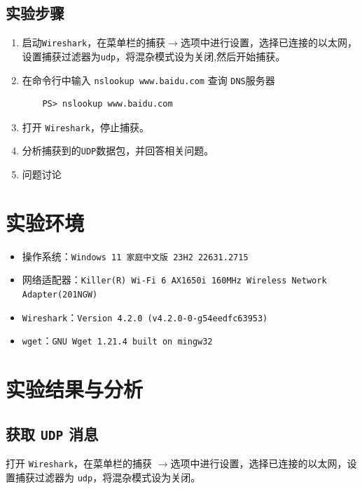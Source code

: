 \documentclass{article}
\begin{document}
\subsection{实验步骤}

\begin{enumerate}[noitemsep, label={{\arabic*})}]
  \item 启动\texttt{Wireshark}，在菜单栏的捕获\(\to \)选项中进行设置，选择已连接的以太网，设置捕获过滤器为\texttt{udp}，将混杂模式设为关闭,然后开始捕获。
  \item 在命令行中输入 \texttt{nslookup www.baidu.com} 查询 \texttt{DNS}服务器

        \begin{lstlisting}
    PS> nslookup www.baidu.com
  \end{lstlisting}
  \item 打开 \texttt{Wireshark}，停止捕获。
  \item 分析捕获到的\texttt{UDP}数据包，并回答相关问题。
  \item 问题讨论
\end{enumerate}

\section{实验环境}


\begin{itemize}[noitemsep]
  \item 操作系统：\texttt{Windows 11 家庭中文版 23H2 22631.2715}
  \item 网络适配器：\texttt{Killer(R) Wi-Fi 6 AX1650i 160MHz Wireless Network Adapter(201NGW)}
  \item \texttt{Wireshark}：\texttt{Version 4.2.0 (v4.2.0-0-g54eedfc63953)}
  \item \texttt{wget}：\texttt{GNU Wget 1.21.4 built on mingw32}
\end{itemize}


\section{实验结果与分析}

\subsection{获取 \texttt{UDP} 消息}

打开 \texttt{Wireshark}，在菜单栏的捕获 \(\to \)选项中进行设置，选择已连接的以太网，设置捕获过滤器为 \texttt{udp}，将混杂模式设为关闭。
\end{document}

